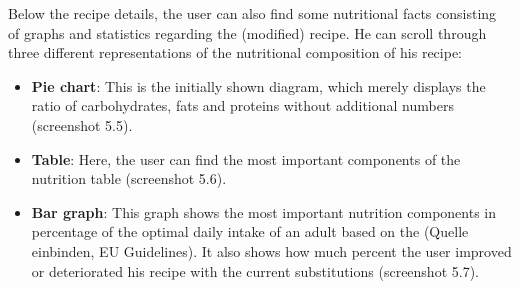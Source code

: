 Below the recipe details, the user can also find some nutritional facts consisting of graphs and statistics regarding the (modified) recipe. He can scroll through three different representations of the nutritional composition of his recipe:
\begin{itemize}
\item \textbf{Pie chart}: This is the initially shown diagram, which merely displays the ratio of carbohydrates, fats and proteins without additional numbers (screenshot 5.5).
\item \textbf{Table}: Here, the user can find the most important components of the nutrition table (screenshot 5.6).
\item \textbf{Bar graph}: This graph shows the most important nutrition components in percentage of the optimal daily intake of an adult based on the (Quelle einbinden, EU Guidelines). It also shows how much percent the user improved or deteriorated his recipe with the current substitutions (screenshot 5.7).
\end{itemize}

